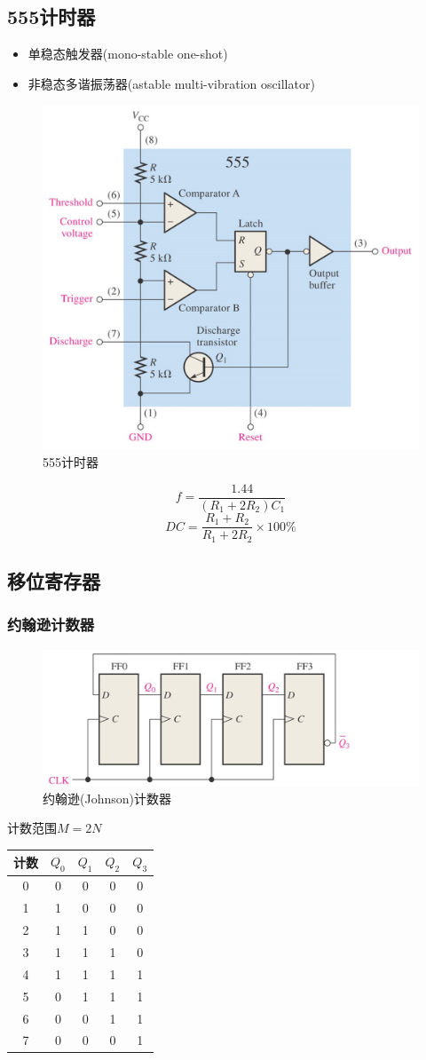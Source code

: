 \subsection{555计时器}
\begin{itemize}
	\item 单稳态触发器(mono-stable one-shot)
	\item 非稳态多谐振荡器(astable multi-vibration oscillator)
\end{itemize}
\begin{figure}[htbp]
	\centering
	\includegraphics[width=0.6\linewidth]{fig/555timer.jpg}
	\caption{555计时器}
\end{figure}
\[f=\dfrac{1.44}{(R_1+2R_2)C_1}\]
\[DC=\dfrac{R_1+R_2}{R_1+2R_2}\times 100\%\]

\subsection{移位寄存器}
\subsubsection{约翰逊计数器}
\begin{figure}[htbp]
	\centering
	\includegraphics[width=0.6\linewidth]{fig/johnson.jpg}
	\caption{约翰逊(Johnson)计数器}
\end{figure}
\par 计数范围$M=2N$
\begin{center}
\begin{tabular}{|c|c|c|c|c|}
\hline
计数 & $Q_0$ & $Q_1$ & $Q_2$ & $Q_3$\\\hline
0 & 0 & 0 & 0 & 0\\\hline
1 & 1 & 0 & 0 & 0\\\hline
2 & 1 & 1 & 0 & 0\\\hline
3 & 1 & 1 & 1 & 0\\\hline
4 & 1 & 1 & 1 & 1\\\hline
5 & 0 & 1 & 1 & 1\\\hline
6 & 0 & 0 & 1 & 1\\\hline
7 & 0 & 0 & 0 & 1\\\hline
\end{tabular}
\end{center}
